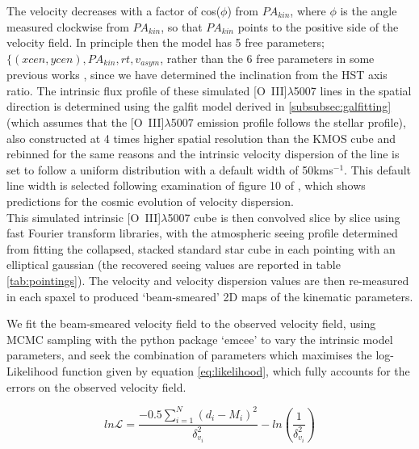 \documentclass[fleqn,usenatbib]{mn2e}
\newcommand{\Lagr}{\mathcal{L}}
\begin{document}
The velocity decreases with a factor of cos($\phi$) from $PA_{kin}$, where $\phi$ is the angle measured clockwise from $PA_{kin}$, so that $PA_{kin}$ points to the positive side of the velocity field.
In principle then the model has 5 free parameters; $\{(xcen, ycen), PA_{kin}, rt, v_{asym}$, rather than the 6 free parameters in some previous works \citep[e.g.][]{Stott2016}, since we have determined the inclination from the HST axis ratio.
The intrinsic flux profile of these simulated [O~{\sc III}]$\lambda$5007 lines in the spatial direction is determined using the galfit model derived in \cref{subsubsec:galfitting} (which assumes that the [O~{\sc III}]$\lambda$5007 emission profile follows the stellar profile), also constructed at 4 times higher spatial resolution than the KMOS cube and rebinned for the same reasons and the intrinsic velocity dispersion of the line is set to follow a uniform distribution with a default width of 50kms$^{-1}$.
This default line width is selected following examination of figure 10 of \cite{Wisnioski2015}, which shows predictions for the cosmic evolution of velocity dispersion. \\

This simulated intrinsic [O~{\sc III}]$\lambda$5007 cube is then convolved slice by slice using fast Fourier transform libraries, with the atmospheric seeing profile determined from fitting the collapsed, stacked standard star cube in each pointing with an elliptical gaussian (the recovered seeing values are reported in table \ref{tab:pointings}).
The velocity and velocity dispersion values are then re-measured in each spaxel to produced `beam-smeared' 2D maps of the kinematic parameters.

We fit the beam-smeared velocity field to the observed velocity field, using MCMC sampling with the python package `emcee' \citep{Foreman-Mackey2013} to vary the intrinsic model parameters, and seek the combination of parameters which maximises the log-Likelihood function given by equation \ref{eq:likelihood}, which fully accounts for the errors on the observed velocity field.

\begin{equation}\label{eq:likelihood}
   ln\Lagr = \frac{-0.5\sum_{i=1}^{N}(d_{i} - M_{i})^{2}}{\delta_{v_{i}}^{2}} - ln\left(\frac{1}{\delta_{v_{i}}^{2}}\right)
\end{equation}
\end{document}
